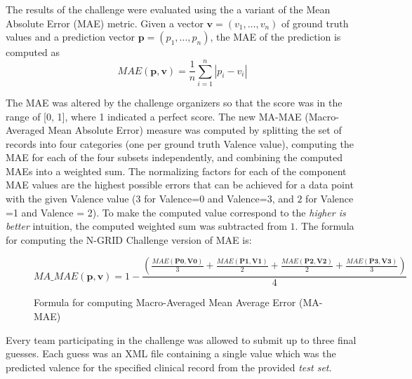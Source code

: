 The results of the challenge were evaluated using the a variant of the \textsf{Mean Absolute Error (MAE)} metric.  Given a vector $\mathbf{v} = (v_1,\ldots,v_n)$ of ground truth values and a prediction
vector $\mathbf{p} = (p_1,\ldots, p_n)$, the \textsf{MAE} of the prediction is computed as 
$$ MAE(\mathbf{p},\mathbf{v}) = \frac{1}{n}\sum_{i=1}^{n}| p_i - v_i|$$

The \textsf{MAE} was altered by the challenge organizers so that the
score was in the range of [0, 1], where 1 indicated a perfect score. The new \textsf{MA-MAE} (\textsf{Macro-Averaged Mean Absolute Error}) measure was computed
by splitting the set of records into four categories (one per ground truth \textsf{Valence} value), computing the \textsf{MAE} for each of the four subsets independently, and combining
the computed \textsf{MAE}s into a weighted sum. The normalizing factors
for each of the component \textsf{MAE} values are the highest possible errors that
can be achieved for a data point with the given \textsf{Valence} value
($3$ for \textsf{Valence=0} and \textsf{Valence=3}, and $2$ for
\textsf{Valence =1} and \textsf{Valence = 2}).
To make the computed value correspond to the
\textit{higher is better} intuition, the computed weighted sum was subtracted from $1$.
The formula for computing the N-GRID Challenge version of \textsf{MAE} is:

\begin{figure}[H]
$$ MA\_MAE(\mathbf{p},\mathbf{v}) = 1 - 
    \frac{(\frac{MAE(\mathbf{P0}, \mathbf{V0})}{3} + 
     \frac{MAE(\mathbf{P1}, \mathbf{V1})}{2} + 
     \frac{MAE(\mathbf{P2}, \mathbf{V2})}{2} + 
     \frac{MAE(\mathbf{P3}, \mathbf{V3})}{3})}{4} $$
 \caption{Formula for computing Macro-Averaged Mean Average Error (MA-MAE)}
 \end{figure}


Every team participating in the challenge was allowed to submit up to three final guesses. Each guess was an XML file containing a single value which was the predicted valence for the specified clinical record from the provided \textit{test set}.
